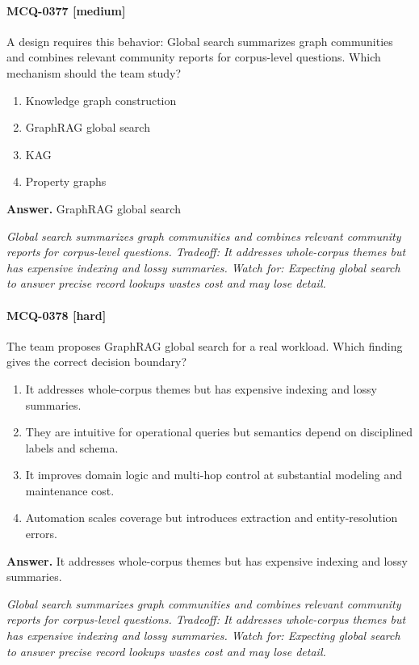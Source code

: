 \paragraph{MCQ-0377 [medium]} A design requires this behavior: Global search summarizes graph communities and combines relevant community reports for corpus-level questions. Which mechanism should the team study?
\begin{enumerate}[label=\Alph*.]
\item Knowledge graph construction
\item GraphRAG global search
\item KAG
\item Property graphs
\end{enumerate}
\noindent\textbf{Answer.} GraphRAG global search
\par\textit{Global search summarizes graph communities and combines relevant community reports for corpus-level questions. Tradeoff: It addresses whole-corpus themes but has expensive indexing and lossy summaries. Watch for: Expecting global search to answer precise record lookups wastes cost and may lose detail.}
\paragraph{MCQ-0378 [hard]} The team proposes GraphRAG global search for a real workload. Which finding gives the correct decision boundary?
\begin{enumerate}[label=\Alph*.]
\item It addresses whole-corpus themes but has expensive indexing and lossy summaries.
\item They are intuitive for operational queries but semantics depend on disciplined labels and schema.
\item It improves domain logic and multi-hop control at substantial modeling and maintenance cost.
\item Automation scales coverage but introduces extraction and entity-resolution errors.
\end{enumerate}
\noindent\textbf{Answer.} It addresses whole-corpus themes but has expensive indexing and lossy summaries.
\par\textit{Global search summarizes graph communities and combines relevant community reports for corpus-level questions. Tradeoff: It addresses whole-corpus themes but has expensive indexing and lossy summaries. Watch for: Expecting global search to answer precise record lookups wastes cost and may lose detail.}
